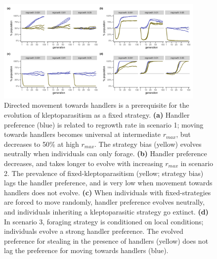 \documentclass[11pt]{article}
\begin{document}
\begin{figure}[h!]
    \centering
    \includegraphics[width=0.90\textwidth]{figures/fig_03_preadaptation.png}
    \caption{Directed movement towards handlers is a prerequisite for the evolution of kleptoparasitism as a fixed strategy.
    \textbf{(a)} Handler preference (blue) is related to regrowth rate in scenario 1; moving towards handlers becomes universal at intermediate $r_{max}$, but decreases to 50\% at high $r_{max}$.
    The strategy bias (yellow) evolves neutrally when individuals can only forage.
    \textbf{(b)} Handler preference decreases, and takes longer to evolve with increasing $r_{max}$ in scenario 2.
    The prevalence of fixed-kleptoparasitism (yellow; strategy bias) lags the handler preference, and is very low when movement towards handlers does not evolve.
    \textbf{(c)} When individuals with fixed-strategies are forced to move randomly, handler preference evolves neutrally, and individuals inheriting a kleptoparasitic strategy go extinct.
    \textbf{(d)} In scenario 3, foraging strategy is conditioned on local conditions; individuals evolve a strong handler preference. 
    The evolved preference for stealing in the presence of handlers (yellow) does not lag the preference for moving towards handlers (blue).
    }
    \label{Fig:HandlerPreferenceBeforeKlept}
\end{figure}
\end{document}
